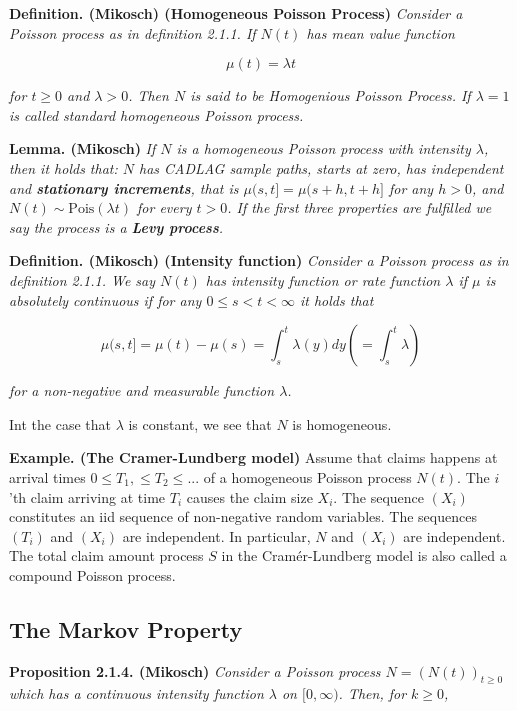 \documentclass[a4paper,12pt,openany]{book}
\begin{document}
\textbf{Definition. (Mikosch) (Homogeneous Poisson Process)} \emph{Consider a Poisson process as in definition 2.1.1. If \(N(t)\) has mean value function}

\[
\mu(t)=\lambda t
\]

\emph{for \(t\ge 0\) and \(\lambda >0\). Then \(N\) is said to be Homogenious Poisson Process. If \(\lambda=1\) is called standard homogeneous Poisson process.}

\textbf{Lemma. (Mikosch)} \emph{If \(N\) is a homogeneous Poisson process with intensity \(\lambda\), then it holds that: \(N\) has CADLAG sample paths, starts at zero, has independent and \textbf{stationary increments}, that is \(\mu(s,t]=\mu(s+h,t+h]\) for any \(h>0\), and \(N(t)\sim \text{Pois}(\lambda t)\) for every \(t>0\). If the first three properties are fulfilled we say the process is a \textbf{Levy process}.}

\textbf{Definition. (Mikosch) (Intensity function)} \emph{Consider a Poisson process as in definition 2.1.1. We say \(N(t)\) has intensity function or rate function \(\lambda\) if \(\mu\) is absolutely continuous if for any \(0\le s <t<\infty\) it holds that}

\[
\mu(s,t]=\mu(t)-\mu(s)=\int^t_s\lambda(y) dy\left(=\int_s^t \lambda\right)
\]

\emph{for a non-negative and measurable function \(\lambda\).}

Int the case that \(\lambda\) is constant, we see that \(N\) is homogeneous.

\textbf{Example. (The Cramer-Lundberg model)} Assume that claims happens at arrival times \(0\le T_1,\le T_2\le ...\) of a homogeneous Poisson process \(N(t)\). The \(i\)'th claim arriving at time \(T_i\) causes the claim size \(X_i\). The sequence \((X_i)\) constitutes an iid sequence of non-negative random variables. The sequences \((T_i)\) and \((X_i)\) are independent. In particular, \(N\) and \((X_i)\) are independent. The total claim amount process \(S\) in the Cramér-Lundberg model is also called a compound Poisson process.

\hypertarget{the-markov-property}{%
\subsection{The Markov Property}\label{the-markov-property}}

\textbf{Proposition 2.1.4. (Mikosch)} \emph{Consider a Poisson process \(N = (N(t))_{t\ge 0}\) which has a continuous intensity function \(\lambda\) on \([0, \infty)\). Then, for \(k \ge 0\),}
\end{document}
